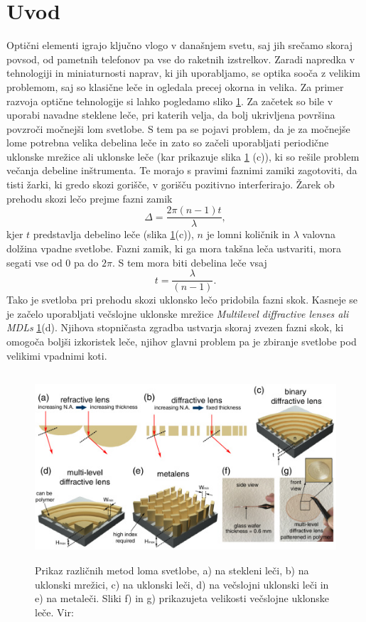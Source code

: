 \documentclass[12pt ]{article}
\begin{document}
 \section{Uvod}
 Optični elementi igrajo ključno vlogo v današnjem svetu, saj jih srečamo skoraj povsod, od pametnih telefonov pa vse do raketnih izstrelkov. Zaradi napredka v tehnologiji in miniaturnosti naprav, ki jih uporabljamo, se optika sooča z velikim problemom, saj so klasične leče in ogledala precej okorna in velika. Za primer razvoja optične tehnologije si lahko pogledamo sliko \ref{Opticna_zgodovina}. Za začetek so bile v uporabi navadne steklene leče, pri katerih velja, da bolj ukrivljena površina povzroči močnejši lom svetlobe. S tem pa se pojavi problem, da je za močnejše lome potrebna velika debelina leče in zato so začeli uporabljati periodične uklonske mrežice ali uklonske leče (kar prikazuje slika \ref{Opticna_zgodovina} (c)), ki so rešile problem večanja debeline inštrumenta. Te morajo s pravimi faznimi zamiki zagotoviti, da tisti žarki, ki gredo skozi gorišče, v gorišču pozitivno interferirajo. Žarek ob prehodu skozi lečo prejme fazni zamik
 \begin{equation}
 \Delta=\frac{2\pi(n-1)t}{\lambda},
 \end{equation} 
kjer $t$ predstavlja debelino leče (slika \ref{Opticna_zgodovina}(c)), $n$ je lomni količnik in $\lambda$ valovna dolžina vpadne svetlobe. Fazni zamik, ki ga mora takšna leča ustvariti, mora segati vse od 0 pa do $2\pi$. S tem mora biti debelina leče vsaj
 \begin{equation}
     t=\frac{\lambda}{(n-1)}.
 \end{equation}
Tako je svetloba pri prehodu skozi uklonsko lečo pridobila fazni skok. Kasneje se je začelo uporabljati večslojne uklonske mrežice \textit{Multilevel diffractive lenses ali MDLs} \ref{Opticna_zgodovina}(d). Njihova stopničasta zgradba ustvarja skoraj zvezen fazni skok, ki omogoča boljši izkoristek leče, njihov glavni problem pa je zbiranje svetlobe pod velikimi vpadnimi koti.
 \begin{figure}[H]
     \centering
     \includegraphics[width=12cm, height=7cm]{Slike/Opticna zgodovina.jpg}
     \caption{Prikaz različnih metod loma svetlobe, a) na stekleni leči, b) na uklonski mrežici, c) na uklonski leči, d) na večslojni uklonski leči in e) na metaleči. Sliki f) in g) prikazujeta velikosti večslojne uklonske leče. Vir: \cite{Zgodovina} }
     \label{Opticna_zgodovina}
 \end{figure}
\end{document}
